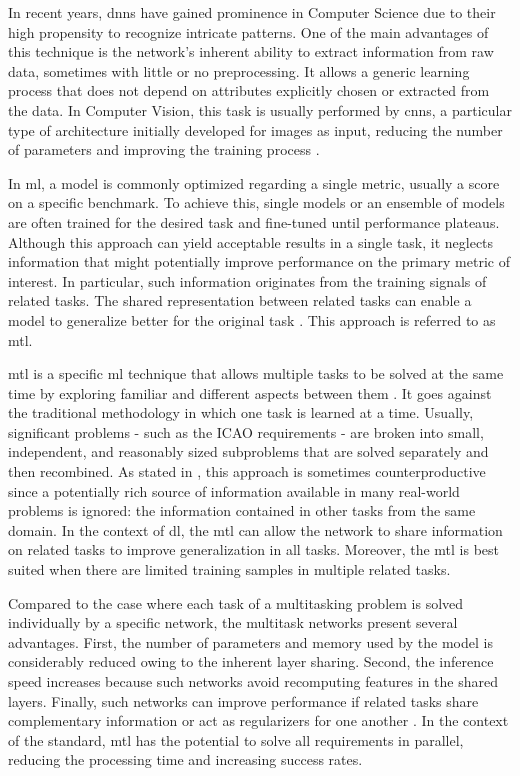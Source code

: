 In recent years, \acfp{dnn} have gained prominence in Computer Science due to their high propensity to recognize intricate patterns. One of the main advantages of this technique is the network's inherent ability to extract information from raw data, sometimes with little or no preprocessing. It allows a generic learning process that does not depend on attributes explicitly chosen or extracted from the data. In Computer Vision, this task is usually performed by \acfp{cnn}, a particular type of architecture initially developed for images as input, reducing the number of parameters and improving the training process \citep{goodfellow2016deep}.
 
In \acf{ml}, a model is commonly optimized regarding a single metric, usually a score on a specific benchmark. To achieve this, single models or an ensemble of models are often trained for the desired task and fine-tuned until performance plateaus. Although this approach can yield acceptable results in a single task, it neglects information that might potentially improve performance on the primary metric of interest. In particular, such information originates from the training signals of related tasks. The shared representation between related tasks can enable a model to generalize better for the original task \citep{ruder2017overview}. This approach is referred to as \acf{mtl}.
 
\acl{mtl} is a specific \acl{ml} technique that allows multiple tasks to be solved at the same time by exploring familiar and different aspects between them \citep{zhang2017survey}. It goes against the traditional methodology in which one task is learned at a time. Usually, significant problems - such as the ICAO requirements - are broken into small, independent, and reasonably sized subproblems that are solved separately and then recombined. As stated in \cite{Caruana1997}, this approach is sometimes counterproductive since a potentially rich source of information available in many real-world problems is ignored: the information contained in other tasks from the same domain. In the context of \acl{dl}, the \acs{mtl} can allow the network to share information on related tasks to improve generalization in all tasks. Moreover, the \acl{mtl} is best suited when there are limited training samples in multiple related tasks.
 
Compared to the case where each task of a multitasking problem is solved individually by a specific network, the multitask networks present several advantages. First, the number of parameters and memory used by the model is considerably reduced owing to the inherent layer sharing. Second, the inference speed increases because such networks avoid recomputing features in the shared layers. Finally, such networks can improve performance if related tasks share complementary information or act as regularizers for one another \citep{vandenhende2021multi}. In the context of the \icao standard, \acs{mtl} has the potential to solve all requirements in parallel, reducing the processing time and increasing success rates.
 
